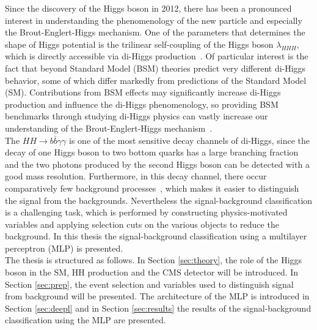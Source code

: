\label{sec:introduction}

Since the discovery of the Higgs boson in 2012, there has been a pronounced interest in understanding the
phenomenology of the new particle and especially the Brout-Englert-Higgs mechanism. One of the parameters
that determines the shape of Higgs potential is the trilinear self-coupling of the Higgs boson $\lambda_{HHH}$,
which is directly accessible via di-Higgs production~\cite{CMS:2021qbp, HandbookLHC}. Of particular interest is the fact that beyond Standard Model (BSM) theories
predict very different di-Higgs behavior, some of which differ markedly from predictions of the Standard Model (SM).
Contributions from BSM effects may significantly increase di-Higgs production and influence the di-Higgs phenomenology, so providing BSM benchmarks
through studying di-Higgs physics can vastly increase our understanding of the Brout-Englert-Higgs mechanism~\cite{HandbookLHC}. \\

The $HH \rightarrow b \bar{b} \gamma \gamma$ is one of the most sensitive decay channels of di-Higgs, since the decay of one Higgs boson
to two bottom quarks has a large branching fraction and the two photons produced by the second Higgs boson can be detected with a good mass resolution.
Furthermore, in this decay channel, there occur comparatively few background processes~\cite{CMS:2021qbp}, which makes it easier to distinguish the signal from the backgrounds.
Nevertheless the signal-background classification
is a challenging task, which is performed by constructing physics-motivated variables and applying selection cuts on the various objects to reduce the background.
In this thesis the signal-background classification using a multilayer perceptron (MLP) is presented. \\

The thesis is structured as follows. In Section \ref{sec:theory}, the role of the Higgs boson in the SM, HH production
and the CMS detector will be introduced. In Section \ref{sec:prep}, the event selection and variables used to distinguish signal from background will be presented.
The architecture of the MLP is introduced in Section \ref{sec:deepl} and in Section \ref{sec:results} the results of the signal-background classification using the MLP are presented.